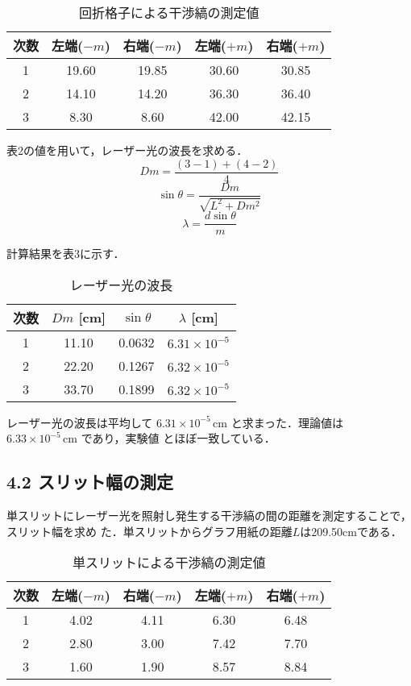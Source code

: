 \documentclass[a4paper,11pt,dvipdfmx]{jsarticle}
\begin{document}
\begin{table}[H]
\centering
\caption{回折格子による干渉縞の測定値}
\begin{tabular}{c|c c c c}
\hline
次数 & 左端($-m$) & 右端($-m$) & 左端($+m$) & 右端($+m$) \\ \hline
1 & 19.60 & 19.85 & 30.60 & 30.85 \\
2 & 14.10 & 14.20 & 36.30 & 36.40 \\
3 & 8.30 & 8.60 & 42.00 & 42.15 \\
\hline
\end{tabular}
\end{table}

表2の値を用いて，レーザー光の波長を求める．
\[
Dm = \frac{(3-1) + (4-2)}{4}
\tag{2}
\]
\[
\sin\theta = \frac{Dm}{\sqrt{L^2 + Dm^2}}
\tag{3}
\]
\[
\lambda = \frac{d \sin\theta}{m}
\tag{4}
\]

計算結果を表3に示す．

\begin{table}[H]
\centering
\caption{レーザー光の波長}
\begin{tabular}{c|c c c}
\hline
次数 & $Dm$ [cm] & $\sin\theta$ & $\lambda$ [cm] \\ \hline
1 & 11.10 & 0.0632 & $6.31\times 10^{-5}$ \\
2 & 22.20 & 0.1267 & $6.32\times 10^{-5}$ \\
3 & 33.70 & 0.1899 & $6.32\times 10^{-5}$ \\
\hline
\end{tabular}
\end{table}

レーザー光の波長は平均して $6.31\times 10^{-5}\,\mathrm{cm}$ と求まった．理論値は $6.33\times 10^{-5}\,\mathrm{cm}$ であり，実験値
とほぼ一致している．

\subsection*{4.2 スリット幅の測定}
単スリットにレーザー光を照射し発生する干渉縞の間の距離を測定することで，スリット幅を求め
た．単スリットからグラフ用紙の距離$L$は209.50cmである．

\begin{table}[H]
\centering
\caption{単スリットによる干渉縞の測定値}
\begin{tabular}{c|c c c c}
\hline
次数 & 左端($-m$) & 右端($-m$) & 左端($+m$) & 右端($+m$) \\ \hline
1 & 4.02 & 4.11 & 6.30 & 6.48 \\
2 & 2.80 & 3.00 & 7.42 & 7.70 \\
3 & 1.60 & 1.90 & 8.57 & 8.84 \\
\hline
\end{tabular}
\end{table}
\end{document}
